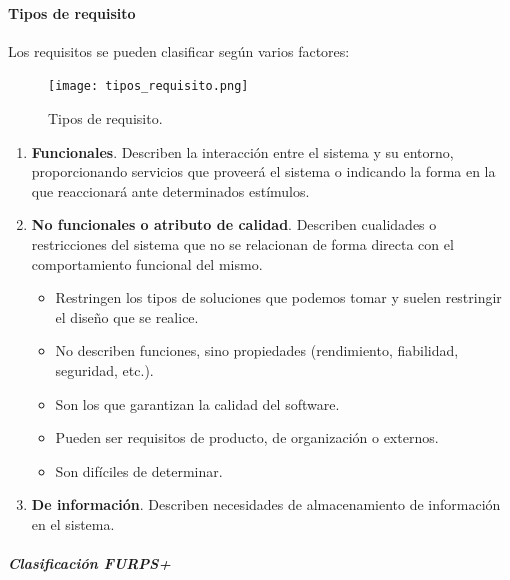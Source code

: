 \documentclass[12pt,spanish]{article}
\begin{document}
\paragraph{Tipos de requisito}
Los requisitos se pueden clasificar según varios factores:
\begin{figure}[H]
\centering
\texttt{[image: tipos\_requisito.png]}
\caption{Tipos de requisito.}
\end{figure}

\begin{enumerate}
	\item \textbf{Funcionales}. Describen la interacción entre el sistema y su entorno, proporcionando servicios que proveerá el sistema o indicando la forma en la que reaccionará ante determinados estímulos.
	\item \textbf{No funcionales o atributo de calidad}. Describen cualidades o restricciones del sistema que no se relacionan de forma directa con el comportamiento funcional del mismo.
	\begin{itemize}
		\item Restringen los tipos de soluciones que podemos tomar y suelen restringir el diseño que se realice.
		\item No describen funciones, sino propiedades (rendimiento, fiabilidad, seguridad, etc.).
		\item Son los que garantizan la calidad del software.
		\item Pueden ser requisitos de producto, de organización o externos.
		\item Son difíciles de determinar.
	\end{itemize}
	\item \textbf{De información}. Describen necesidades de almacenamiento de información en el sistema.
\end{enumerate}

\subparagraph{Clasificación FURPS+}
\end{document}
